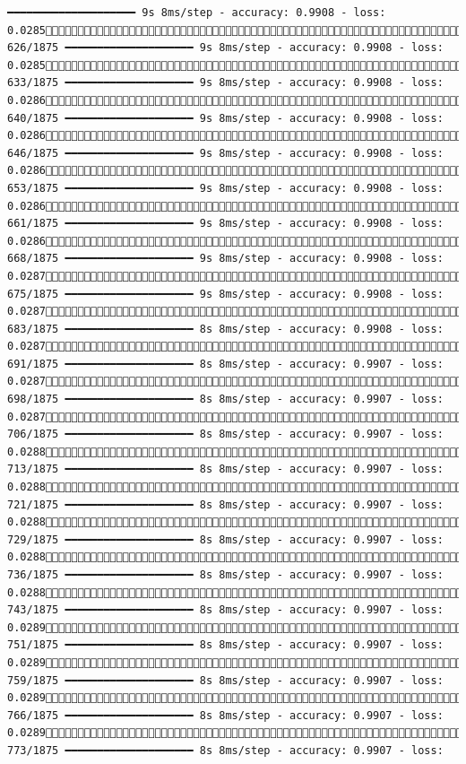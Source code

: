 \documentclass[
  letterpaper,
  DIV=11,
  numbers=noendperiod]{scrreprt}
\begin{document}
\begin{verbatim}
━━━━━━━━━━━━━━━━━━━━ 9s 8ms/step - accuracy: 0.9908 - loss: 0.0285 626/1875 ━━━━━━━━━━━━━━━━━━━━ 9s 8ms/step - accuracy: 0.9908 - loss: 0.0285 633/1875 ━━━━━━━━━━━━━━━━━━━━ 9s 8ms/step - accuracy: 0.9908 - loss: 0.0286 640/1875 ━━━━━━━━━━━━━━━━━━━━ 9s 8ms/step - accuracy: 0.9908 - loss: 0.0286 646/1875 ━━━━━━━━━━━━━━━━━━━━ 9s 8ms/step - accuracy: 0.9908 - loss: 0.0286 653/1875 ━━━━━━━━━━━━━━━━━━━━ 9s 8ms/step - accuracy: 0.9908 - loss: 0.0286 661/1875 ━━━━━━━━━━━━━━━━━━━━ 9s 8ms/step - accuracy: 0.9908 - loss: 0.0286 668/1875 ━━━━━━━━━━━━━━━━━━━━ 9s 8ms/step - accuracy: 0.9908 - loss: 0.0287 675/1875 ━━━━━━━━━━━━━━━━━━━━ 9s 8ms/step - accuracy: 0.9908 - loss: 0.0287 683/1875 ━━━━━━━━━━━━━━━━━━━━ 8s 8ms/step - accuracy: 0.9908 - loss: 0.0287 691/1875 ━━━━━━━━━━━━━━━━━━━━ 8s 8ms/step - accuracy: 0.9907 - loss: 0.0287 698/1875 ━━━━━━━━━━━━━━━━━━━━ 8s 8ms/step - accuracy: 0.9907 - loss: 0.0287 706/1875 ━━━━━━━━━━━━━━━━━━━━ 8s 8ms/step - accuracy: 0.9907 - loss: 0.0288 713/1875 ━━━━━━━━━━━━━━━━━━━━ 8s 8ms/step - accuracy: 0.9907 - loss: 0.0288 721/1875 ━━━━━━━━━━━━━━━━━━━━ 8s 8ms/step - accuracy: 0.9907 - loss: 0.0288 729/1875 ━━━━━━━━━━━━━━━━━━━━ 8s 8ms/step - accuracy: 0.9907 - loss: 0.0288 736/1875 ━━━━━━━━━━━━━━━━━━━━ 8s 8ms/step - accuracy: 0.9907 - loss: 0.0288 743/1875 ━━━━━━━━━━━━━━━━━━━━ 8s 8ms/step - accuracy: 0.9907 - loss: 0.0289 751/1875 ━━━━━━━━━━━━━━━━━━━━ 8s 8ms/step - accuracy: 0.9907 - loss: 0.0289 759/1875 ━━━━━━━━━━━━━━━━━━━━ 8s 8ms/step - accuracy: 0.9907 - loss: 0.0289 766/1875 ━━━━━━━━━━━━━━━━━━━━ 8s 8ms/step - accuracy: 0.9907 - loss: 0.0289 773/1875 ━━━━━━━━━━━━━━━━━━━━ 8s 8ms/step - accuracy: 0.9907 - loss: 
\end{verbatim}
\end{document}
